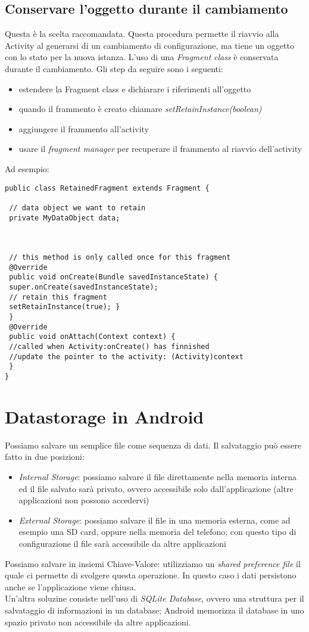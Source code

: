 \subsection{Conservare l'oggetto durante il cambiamento}
Questa è la scelta raccomandata. Questa procedura permette il riavvio alla 
Activity al generarsi di un cambiamento di configurazione, ma tiene un oggetto
con lo stato per la nuova istanza. L'uso di una \textit{Fragment} \textit{class}
è conservata durante il cambiamento. Gli step da seguire sono i seguenti:
\begin{itemize}
    \item estendere la Fragment class e dichiarare i riferimenti all'oggetto
    \item quando il frammento è creato chiamare
\textit{setRetainInstance(boolean)}
    \item aggiungere il frammento all'activity
    \item usare il \textit{fragment manager} per recuperare il frammento al
riavvio dell'activity
\end{itemize}
Ad esempio:
\begin{lstlisting}[frame=single]
public class RetainedFragment extends Fragment {

 // data object we want to retain
 private MyDataObject data;



 // this method is only called once for this fragment
 @Override
 public void onCreate(Bundle savedInstanceState) {
 super.onCreate(savedInstanceState);
 // retain this fragment
 setRetainInstance(true); }
 }
 @Override
 public void onAttach(Context context) {
 //called when Activity:onCreate() has finnished
 //update the pointer to the activity: (Activity)context
 }
}
\end{lstlisting}
\section{Datastorage in Android}
Possiamo salvare un semplice file come sequenza di dati. Il salvataggio può 
essere fatto in due posizioni:
\begin{itemize}
    \item \textit{Internal Storage}: possiamo salvare il file direttamente nella
memoria interna ed il file salvato sarà privato, ovvero accessibile solo
dall'applicazione (altre applicazioni non possono accedervi)
    \item \textit{External Storage}: possiamo salvare il file in una memoria
esterna, come ad esempio una SD card, oppure nella memoria del telefono; con
questo tipo di configurazione il file sarà accessibile da altre applicazioni
\end{itemize}
Possiamo salvare in insiemi Chiave-Valore: utilizziamo un \textit{shared
preference file} il quale ci permette di svolgere questa operazione. In questo
caso i dati persistono anche se l'applicazione viene chiusa. \\
Un'altra soluzine consiste nell'uso di \textit{SQLite Database}, ovvero una
struttura per il salvataggio di informazioni in un database; Android memorizza
il database in uno spazio privato non accessibile da altre applicazioni.
